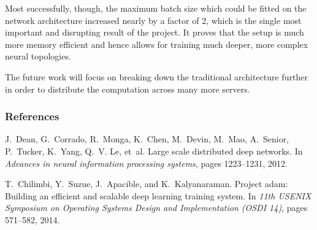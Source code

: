 \documentclass[letterpaper]{article}
\begin{document}
Most successfully, though, the maximum batch size which could be fitted on the network architecture increased nearly by a factor of 2, which is the single most important and disrupting result of the project. It proves that the setup is much more memory efficient and hence allows for training much deeper, more complex neural topologies.

The future work will focus on breaking down the traditional architecture further in order to distribute the computation across many more servers.


\newpage

\subsubsection*{References}

J.~Dean, G.~Corrado, R.~Monga, K.~Chen, M.~Devin, M.~Mao, A.~Senior, P.~Tucker,
K.~Yang, Q.~V. Le, et~al.
\newblock Large scale distributed deep networks.
\newblock In {\em Advances in neural information processing systems}, pages
1223--1231, 2012.

T.~Chilimbi, Y.~Suzue, J.~Apacible, and K.~Kalyanaraman.
\newblock Project adam: Building an efficient and scalable deep learning
training system.
\newblock In {\em 11th USENIX Symposium on Operating Systems Design and
	Implementation (OSDI 14)}, pages 571--582, 2014.
\end{document}
